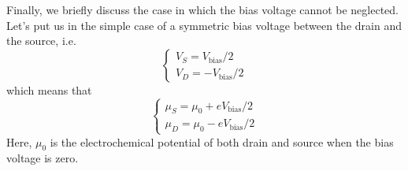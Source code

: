Finally, we briefly discuss the case in which the bias voltage cannot be neglected. Let's put us in the simple case of a symmetric bias voltage between the drain and the source, i.e.
\begin{equation}
	\begin{cases}
		V_S = V_{\text{bias}}/2 \\
		V_D = -V_{\text{bias}}/2
	\end{cases}
\end{equation}
which means that
\begin{equation}
	\begin{cases}
		\mu_S = \mu_0 + eV_{\text{bias}}/2 \\
		\mu_D = \mu_0 - eV_{\text{bias}}/2
	\end{cases}
\end{equation}
Here, $\mu_0$ is the electrochemical potential of both drain and source when the bias voltage is zero.

